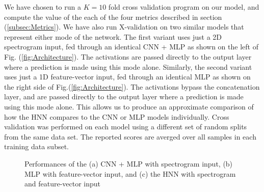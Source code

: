 \documentclass[conference,onecolumn,letterpaper]{IEEEtran}
\begin{document}
We have chosen to run a $K = 10$ fold cross validation program on our model, and compute the value of the each of the four metrics described in section (\ref{subsec:Metrics}). We have also run X-validation on two similar models that represent either mode of the network. The first variant uses just a 2D spectrogram input, fed through an identical CNN + MLP as shown on the left of Fig. (\ref{fig:Architecture}). The activations are passed directly to the output layer where a prediction is made using this mode alone. Similarly, the second variant uses just a 1D feature-vector input, fed through an identical MLP as shown on the right side of Fig.(\ref{fig:Architecture}). The activations bypass the concatenation layer, and are passed directly to the output layer where a prediction is made using this mode alone. This allows us to produce an approximate comparison of how the HNN compares to the CNN or MLP models individually. Cross validation was performed on each model using a different set of random splits from the same data set. The reported scores are averged over all samples in each training data subset.

\begin{figure}[H]
    \centering
    \caption{Performances of the (a) CNN + MLP with spectrogram input, (b) MLP with feature-vector input, and (c) the HNN with spectrogram and feature-vector input}
    \label{fig:XvalScores}
\end{figure}
\end{document}
